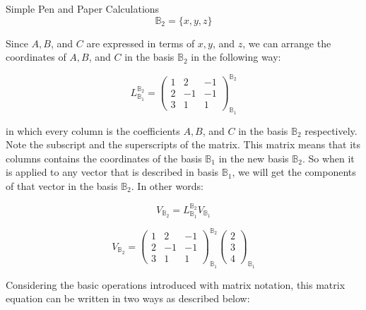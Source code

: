 \begin{example}{Simple Pen and Paper Calculations}
	\begin{equation*}
		\mathbb{B}_2 = \{ x,y,z \}
	\end{equation*}
	
	 Since $A,B$, and $C$ are expressed in terms of $x,y$, and $z$, we can arrange the coordinates of $A,B$, and $C$ in the basis $\mathbb{B}_2$ in the following way:
	 
	 \begin{equation*}
	 	L_{\mathbb{B}_1}^{\mathbb{B}_2} = \begin{pmatrix}
	 		1 & 2 & -1 \\
	 		2 & -1 & -1 \\
	 		3 & 1 & 1
	 	\end{pmatrix}_{\mathbb{B}_1}^{\mathbb{B}_2}
	 \end{equation*}
 
 	in which every column is the coefficients $A,B$, and $C$ in the basis $\mathbb{B}_2$ respectively. Note the subscript and the superscripts of the matrix. This matrix means that its columns contains the coordinates of the basis $\mathbb{B}_1$ in the new basis $\mathbb{B}_2$. So when it is applied to any vector that is described in basis $\mathbb{B}_1$, we will get the components of that vector in the basis $\mathbb{B}_2$. In other words:
 	
 	\begin{equation*}
 		V_{\mathbb{B}_2} = L_{\mathbb{B}_1}^{\mathbb{B}_2} V_{\mathbb{B}_1}
 	\end{equation*}
 
	\begin{equation}
		V_{\mathbb{B}_2} = 
		\begin{pmatrix}
			1 & 2 & -1 \\
			2 & -1 & -1 \\
			3 & 1 & 1
		\end{pmatrix}_{\mathbb{B}_1}^{\mathbb{B}_2}
		\begin{pmatrix}
			2 \\
			3 \\
			4
		\end{pmatrix}_{\mathbb{B}_1}
		\label{example:SomplePenPaper:matrixEquation}
	\end{equation}

	Considering the basic operations introduced with matrix notation, this matrix equation can be written in two ways as described below:
	

\end{example}
